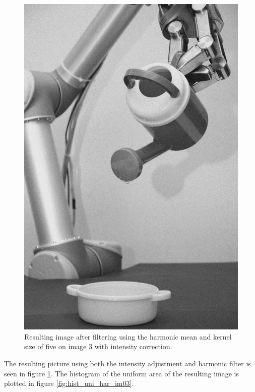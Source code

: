 \begin{figure}[H]
\centering
\includegraphics[width= \fullImageWidth]{../code/images/image_harmonic_03}
\caption{Resulting image after filtering using the harmonic mean and kernel size of five on image 3 with intensity correction.}
\label{fig:img_result_im03}
\end{figure}


The resulting picture using both the intensity adjustment and harmonic filter is seen in figure \ref{fig:img_result_im03}.
The histogram of the uniform area of the resulting image is plotted in figure  \ref{fig:hist_uni_har_im03}.


